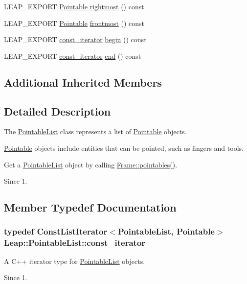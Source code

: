 \begin{DoxyCompactItemize}
L\+E\+A\+P\+\_\+\+E\+X\+P\+O\+R\+T \hyperlink{class_leap_1_1_pointable}{Pointable} \hyperlink{class_leap_1_1_pointable_list_a9c5a12d32479519c7319c220b12dbfc5}{rightmost} () const 
\item 
L\+E\+A\+P\+\_\+\+E\+X\+P\+O\+R\+T \hyperlink{class_leap_1_1_pointable}{Pointable} \hyperlink{class_leap_1_1_pointable_list_afba3b5c70ce4b4939498b62f7cf7b9ba}{frontmost} () const 
\item 
L\+E\+A\+P\+\_\+\+E\+X\+P\+O\+R\+T \hyperlink{class_leap_1_1_pointable_list_a12b640b8c7e70885884a3a6ee903c21c}{const\+\_\+iterator} \hyperlink{class_leap_1_1_pointable_list_ae655d2e1fe70d0a15aab2da083e7f712}{begin} () const 
\item 
L\+E\+A\+P\+\_\+\+E\+X\+P\+O\+R\+T \hyperlink{class_leap_1_1_pointable_list_a12b640b8c7e70885884a3a6ee903c21c}{const\+\_\+iterator} \hyperlink{class_leap_1_1_pointable_list_a4dbbb5bcc6f3db906b3693ddc2aa3d6e}{end} () const 
\end{DoxyCompactItemize}
\subsection*{Additional Inherited Members}


\subsection{Detailed Description}
The \hyperlink{class_leap_1_1_pointable_list}{Pointable\+List} class represents a list of \hyperlink{class_leap_1_1_pointable}{Pointable} objects.

\hyperlink{class_leap_1_1_pointable}{Pointable} objects include entities that can be pointed, such as fingers and tools.

Get a \hyperlink{class_leap_1_1_pointable_list}{Pointable\+List} object by calling \hyperlink{class_leap_1_1_frame_a1bc989343a3b971568368c77b5869fb9}{Frame\+::pointables()}. \begin{DoxySince}{Since}
1. 
\end{DoxySince}


\subsection{Member Typedef Documentation}
\hypertarget{class_leap_1_1_pointable_list_a12b640b8c7e70885884a3a6ee903c21c}{
\subsubsection[{const\+\_\+iterator}]{\setlength{\rightskip}{0pt plus 5cm}typedef {\bf Const\+List\+Iterator}$<${\bf Pointable\+List}, {\bf Pointable}$>$ {\bf Leap\+::\+Pointable\+List\+::const\+\_\+iterator}}}\label{class_leap_1_1_pointable_list_a12b640b8c7e70885884a3a6ee903c21c}
A C++ iterator type for \hyperlink{class_leap_1_1_pointable_list}{Pointable\+List} objects. \begin{DoxySince}{Since}
1. 
\end{DoxySince}



